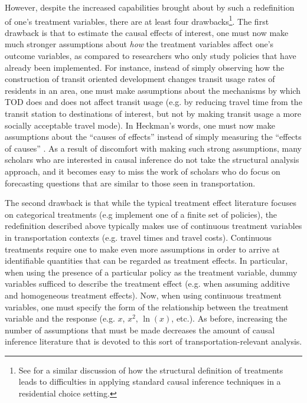 However, despite the increased capabilities brought about by such a redefinition of one's treatment variables, there are at least four drawbacks\footnote{See \citet[Footnote 10]{mokhtarian_2016_quantifying} for a similar discussion of how the structural definition of treatments leads to difficulties in applying standard causal inference techniques in a residential choice setting.}. The first drawback is that to estimate the causal effects of interest, one must now make much stronger assumptions about \textit{how} the treatment variables affect one's outcome variables, as compared to researchers who only study policies that have already been implemented. For instance, instead of simply observing how the construction of transit oriented development changes transit usage rates of residents in an area, one must make assumptions about the mechanisms by which TOD does and does not affect transit usage (e.g. by reducing travel time from the transit station to destinations of interest, but not by making transit usage a more socially acceptable travel mode). In Heckman's words, one must now make assumptions about the ``causes of effects'' instead of simply measuring the ``effects of causes'' \citep{heckman2005scientific}. As a result of discomfort with making such strong assumptions, many scholars who are interested in causal inference do not take the structural analysis approach, and it becomes easy to miss the work of scholars who do focus on forecasting questions that are similar to those seen in transportation.

The second drawback is that while the typical treatment effect literature focuses on categorical treatments (e.g implement one of a finite set of policies), the redefinition described above typically makes use of continuous treatment variables in transportation contexts (e.g. travel times and travel costs). Continuous treatments require one to make even more assumptions in order to arrive at identifiable quantities that can be regarded as treatment effects. In particular, when using the presence of a particular policy as the treatment variable, dummy variables sufficed to describe the treatment effect (e.g. when assuming additive and homogeneous treatment effects). Now, when using continuous treatment variables, one must specify the form of the relationship between the treatment variable and the response (e.g. $x$, $x^2$, $\ln \left( x \right)$, etc.). As before, increasing the number of assumptions that must be made decreases the amount of causal inference literature that is devoted to this sort of transportation-relevant analysis. 

